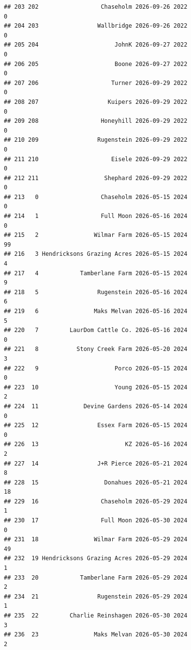 \documentclass[
]{article}
\begin{document}
\begin{verbatim}
## 203 202                  Chaseholm 2026-09-26 2022                       0
## 204 203                 Wallbridge 2026-09-26 2022                       0
## 205 204                      JohnK 2026-09-27 2022                       0
## 206 205                      Boone 2026-09-27 2022                       0
## 207 206                     Turner 2026-09-29 2022                       0
## 208 207                    Kuipers 2026-09-29 2022                       0
## 209 208                  Honeyhill 2026-09-29 2022                       0
## 210 209                 Rugenstein 2026-09-29 2022                       0
## 211 210                     Eisele 2026-09-29 2022                       0
## 212 211                   Shephard 2026-09-29 2022                       0
## 213   0                  Chaseholm 2026-05-15 2024                       0
## 214   1                  Full Moon 2026-05-16 2024                       0
## 215   2                Wilmar Farm 2026-05-15 2024                      99
## 216   3 Hendricksons Grazing Acres 2026-05-15 2024                       4
## 217   4            Tamberlane Farm 2026-05-15 2024                       9
## 218   5                 Rugenstein 2026-05-16 2024                       6
## 219   6                Maks Melvan 2026-05-16 2024                       5
## 220   7         LaurDom Cattle Co. 2026-05-16 2024                       0
## 221   8           Stony Creek Farm 2026-05-20 2024                       3
## 222   9                      Porco 2026-05-15 2024                       0
## 223  10                      Young 2026-05-15 2024                       2
## 224  11             Devine Gardens 2026-05-14 2024                       0
## 225  12                 Essex Farm 2026-05-15 2024                       0
## 226  13                         KZ 2026-05-16 2024                       2
## 227  14                 J+R Pierce 2026-05-21 2024                       8
## 228  15                   Donahues 2026-05-21 2024                      18
## 229  16                  Chaseholm 2026-05-29 2024                       1
## 230  17                  Full Moon 2026-05-30 2024                       0
## 231  18                Wilmar Farm 2026-05-29 2024                      49
## 232  19 Hendricksons Grazing Acres 2026-05-29 2024                       1
## 233  20            Tamberlane Farm 2026-05-29 2024                       2
## 234  21                 Rugenstein 2026-05-29 2024                       1
## 235  22         Charlie Reinshagen 2026-05-30 2024                       3
## 236  23                Maks Melvan 2026-05-30 2024                       2

\end{verbatim}
\end{document}
